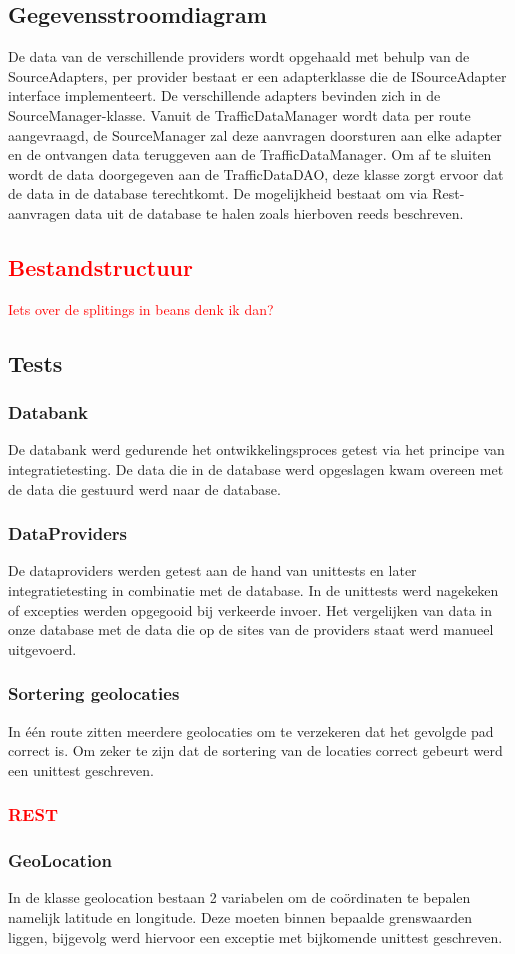 \documentclass[ps,a4paper,oneside]{report}
\begin{document}
\subsection{Gegevensstroomdiagram}
De data van de verschillende providers wordt opgehaald met behulp van de SourceAdapters, per provider bestaat er een adapterklasse die de ISourceAdapter interface implementeert. De verschillende adapters bevinden zich in de \\SourceManager-klasse. Vanuit de TrafficDataManager wordt data per route aangevraagd, de SourceManager zal deze aanvragen doorsturen aan elke adapter en de ontvangen data teruggeven aan de TrafficDataManager. Om af te sluiten wordt de data doorgegeven aan de TrafficDataDAO, deze klasse zorgt ervoor dat de data in de database terechtkomt. De mogelijkheid bestaat om via Rest-aanvragen data uit de database te halen zoals hierboven reeds beschreven.
\textcolor{red}{\subsection{Bestandstructuur}
Iets over de splitings in beans denk ik dan?
}
\subsection{Tests}
\subsubsection{Databank}
De databank werd gedurende het ontwikkelingsproces getest via het principe van integratietesting. De data die in de database werd opgeslagen kwam overeen met de data die gestuurd werd naar de database.
\subsubsection{DataProviders}
De dataproviders werden getest aan de hand van unittests en later integratietesting in combinatie met de database. In de unittests werd nagekeken of excepties werden opgegooid bij verkeerde invoer. Het vergelijken van data in onze database met de data die op de sites van de providers staat werd manueel uitgevoerd.
\subsubsection{Sortering geolocaties}
In \'e\'en route zitten meerdere geolocaties om te verzekeren dat het gevolgde pad correct is. Om zeker te zijn dat de sortering van de locaties correct gebeurt werd een unittest geschreven.
\textcolor{red}{\subsubsection{REST}}
\subsubsection{GeoLocation}
In de klasse geolocation bestaan 2 variabelen om de co\"ordinaten te bepalen namelijk latitude en longitude. Deze moeten binnen bepaalde grenswaarden liggen, bijgevolg werd hiervoor een exceptie met bijkomende unittest geschreven.
\end{document}
